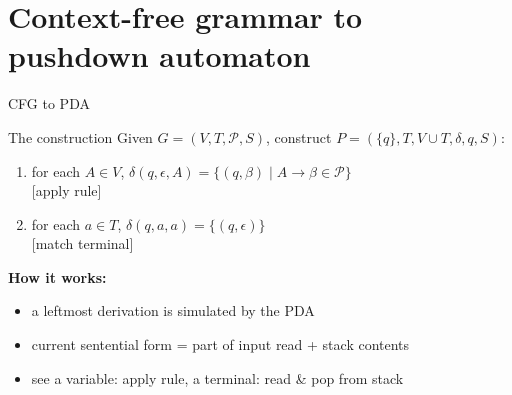 \documentclass[handout]{beamer}
\begin{document}
\section*{Context-free grammar to pushdown automaton}


\begin{frame}{CFG to PDA}

    \begin{block}{The construction}
        Given $G=(V,T,\mathcal P,S)$, construct $P=(\{q\},T,V\cup T,\delta,q,S)$:
        \begin{enumerate}[(1)]
            \item for each $ A\in V$, \alert{$\delta(q,\epsilon, A)=\{(q,\beta)\mid A\rightarrow \beta \in\mathcal P\}$} \\ \hfill [apply rule]
            \item for each $a\in T$, \alert{$\delta(q,a,a)=\{(q,\epsilon)\}$}\\ \hfill [match terminal]
        \end{enumerate}   
    \end{block} 

    \textbf{How it works:}
    \begin{itemize}
        \item a \alert{leftmost} derivation is simulated by the PDA
        \item current sentential form = part of input read + stack contents
        \item see a variable: apply rule, a terminal: read \& pop from stack
    \end{itemize}

\end{frame}
\end{document}
